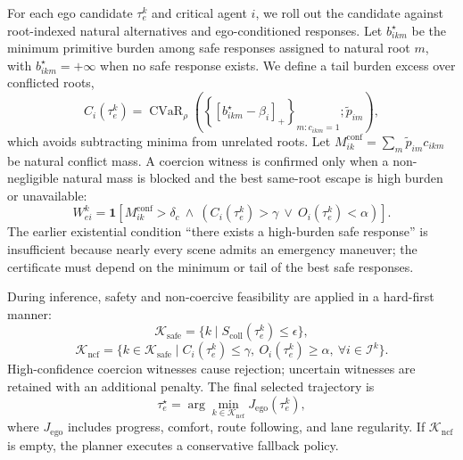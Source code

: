 \documentclass[10pt]{article}
\begin{document}
For each ego candidate $\tau^k_e$ and critical agent $i$, we roll out the candidate against root-indexed natural alternatives and ego-conditioned responses. Let $b^{\star}_{ikm}$ be the minimum primitive burden among safe responses assigned to natural root $m$, with $b^{\star}_{ikm}=+\infty$ when no safe response exists. We define a tail burden excess over conflicted roots,
\begin{equation}
    C_i(\tau^k_e)
    =\operatorname{CVaR}_{\rho}
    \left(
      \left\{[b^{\star}_{ikm}-\beta_i]_+\right\}_{m:c_{ikm}=1};
      \widetilde p_{im}
    \right),
\end{equation}
which avoids subtracting minima from unrelated roots. Let $M^{\mathrm{conf}}_{ik}=\sum_m\widetilde p_{im}c_{ikm}$ be natural conflict mass. A coercion witness is confirmed only when a non-negligible natural mass is blocked and the best same-root escape is high burden or unavailable:
\begin{equation}
    W^k_{ei}=\mathbf{1}
    \left[
      M^{\mathrm{conf}}_{ik}>\delta_c
      \ \wedge\
      \left(C_i(\tau^k_e)>\gamma\ \vee\ O_i(\tau^k_e)<\alpha\right)
    \right].
    \label{eq:witness}
\end{equation}
The earlier existential condition ``there exists a high-burden safe response'' is insufficient because nearly every scene admits an emergency maneuver; the certificate must depend on the minimum or tail of the best safe responses.

During inference, safety and non-coercive feasibility are applied in a hard-first manner:
\begin{equation}
    \mathcal{K}_{\mathrm{safe}}
    =
    \{k \mid S_{\mathrm{coll}}(\tau^k_e)\le \epsilon \},
\end{equation}
\begin{equation}
    \mathcal{K}_{\mathrm{ncf}}
    =
    \{k\in\mathcal{K}_{\mathrm{safe}}
    \mid
    C_i(\tau^k_e)\le \gamma,\ 
    O_i(\tau^k_e)\ge \alpha,\ 
    \forall i\in\mathcal{I}^k
    \}.
\end{equation}
High-confidence coercion witnesses cause rejection; uncertain witnesses are retained with an additional penalty. The final selected trajectory is
\begin{equation}
    \tau^\star_e
    =
    \arg\min_{k\in\mathcal{K}_{\mathrm{ncf}}}
    J_{\mathrm{ego}}(\tau^k_e),
\end{equation}
where $J_{\mathrm{ego}}$ includes progress, comfort, route following, and lane regularity. If $\mathcal{K}_{\mathrm{ncf}}$ is empty, the planner executes a conservative fallback policy.
\end{document}
